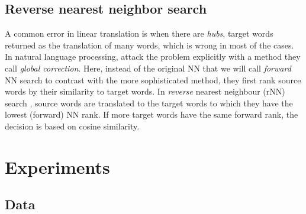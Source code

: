 \documentclass[11pt]{article}
\begin{document}
\subsection{Reverse nearest neighbor search}



A common error in linear translation is when there are \emph{hubs}, target
words returned as the translation of many words, which is wrong in most of the
cases.  In natural language processing, \cite{Dinu:2015} attack the problem
explicitly with a method they call \emph{global correction}.  Here, instead of
the original NN that we will call \emph{forward} NN search to contrast with the
more sophisticated method, they first rank source words by their similarity to
target words. In \emph{reverse} nearest neighbour (rNN) search , source words are translated to the target
words to which they have the lowest (forward) NN rank.  If more target
words have the same forward rank, the decision is based on cosine similarity.



\section{Experiments}

\subsection{Data}
\end{document}
